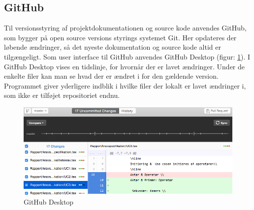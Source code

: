 \subsection{GitHub}
Til versionsstyring af projektdokumentationen og source kode anvendes GitHub, som bygger på open source versions styrings systemet Git. Her opdateres der løbende ændringer, så det nyeste dokumentation og source kode altid er tilgængeligt. 
Som user interface til GitHub anvendes GitHub Desktop (figur: \ref{fig:git}). I GitHub Desktop vises en tidslinje, for hvornår der er lavet ændringer. Under de enkelte filer kan man se hvad der er ændret i for den gældende version. Programmet giver yderligere indblik i hvilke filer der lokalt er lavet ændringer i, som ikke er tilføjet repositoriet endnu.
\begin{figure}[H]
	\centering
	\includegraphics[width=1\textwidth]{billeder/github.png}
	\caption{GitHub Desktop}
	\label{fig:git}
\end{figure}
\newpage

